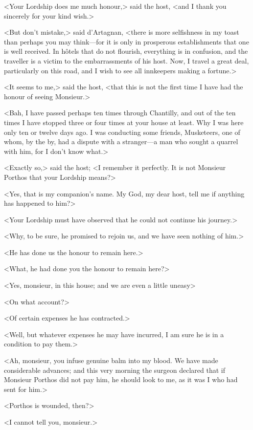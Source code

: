 <Your Lordship does me much honour,> said the host, <and I thank you sincerely for your kind wish.> 

<But don't mistake,> said d'Artagnan, <there is more selfishness in my toast than perhaps you may think---for it is only in prosperous establishments that one is well received. In hôtels that do not flourish, everything is in confusion, and the traveller is a victim to the embarrassments of his host. Now, I travel a great deal, particularly on this road, and I wish to see all innkeepers making a fortune.> 

<It seems to me,> said the host, <that this is not the first time I have had the honour of seeing Monsieur.> 

<Bah, I have passed perhaps ten times through Chantilly, and out of the ten times I have stopped three or four times at your house at least. Why I was here only ten or twelve days ago. I was conducting some friends, Musketeers, one of whom, by the by, had a dispute with a stranger---a man who sought a quarrel with him, for I don't know what.> 

<Exactly so,> said the host; <I remember it perfectly. It is not Monsieur Porthos that your Lordship means?> 

<Yes, that is my companion's name. My God, my dear host, tell me if anything has happened to him?> 

<Your Lordship must have observed that he could not continue his journey.> 

<Why, to be sure, he promised to rejoin us, and we have seen nothing of him.> 

<He has done us the honour to remain here.> 

<What, he had done you the honour to remain here?> 

<Yes, monsieur, in this house; and we are even a little uneasy\longdash> 

<On what account?> 

<Of certain expenses he has contracted.> 

<Well, but whatever expenses he may have incurred, I am sure he is in a condition to pay them.> 

<Ah, monsieur, you infuse genuine balm into my blood. We have made considerable advances; and this very morning the surgeon declared that if Monsieur Porthos did not pay him, he should look to me, as it was I who had sent for him.> 

<Porthos is wounded, then?> 

<I cannot tell you, monsieur.> 

